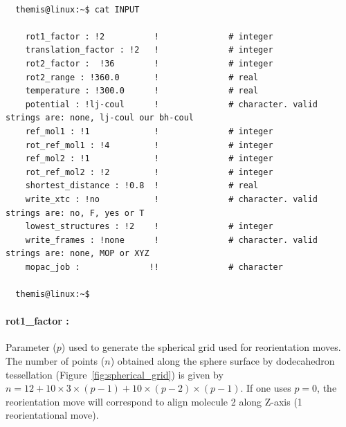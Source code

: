 \documentclass[10pt,a4paper]{report}
\begin{document}
\begin{center}
  \begin{minipage}{0.85\textwidth}
    \vskip0.25cm
    \begin{verbatim}

  themis@linux:~$ cat INPUT 

    rot1_factor : !2          !              # integer
    translation_factor : !2   !              # integer
    rot2_factor :  !36        !              # integer
    rot2_range : !360.0       !              # real 
    temperature : !300.0      !              # real
    potential : !lj-coul      !              # character. valid strings are: none, lj-coul our bh-coul
    ref_mol1 : !1             !              # integer
    rot_ref_mol1 : !4         !              # integer
    ref_mol2 : !1             !              # integer
    rot_ref_mol2 : !2         !              # integer
    shortest_distance : !0.8  !              # real
    write_xtc : !no           !              # character. valid strings are: no, F, yes or T
    lowest_structures : !2    !              # integer
    write_frames : !none      !              # character. valid strings are: none, MOP or XYZ
    mopac_job :              !!              # character

  themis@linux:~$

    \end{verbatim}
  \end{minipage}%
\end{center}

\paragraph{rot1\_factor :} 

  Parameter ($p$) used to generate the spherical 
  grid used for reorientation moves. The number of points ($n$) obtained along 
  the sphere surface by dodecahedron tessellation (Figure~\ref{fig:spherical_grid}) 
  is given by $ n = 12 + 10 \times 3 \times ( p - 1 ) + 10 \times ( p - 2 ) \times ( p - 1 ) $.
  If one uses $p = 0$, the reorientation move will correspond to align molecule 2 along 
  Z-axis (1 reorientational move). 
\end{document}
